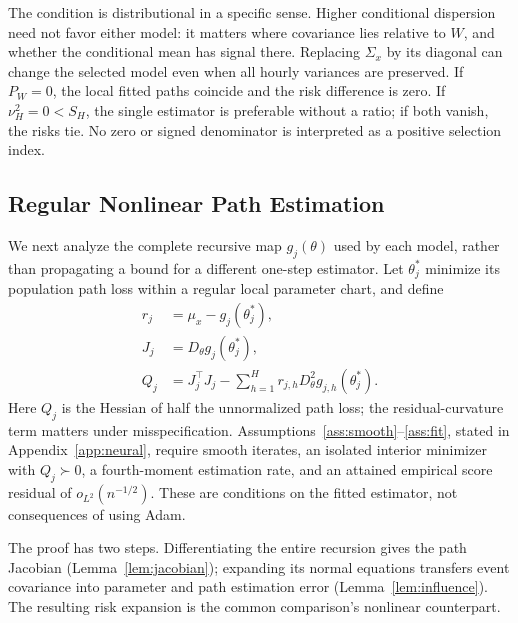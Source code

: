 The condition is distributional in a specific sense. Higher conditional dispersion need not favor either model: it matters where covariance lies relative to $W$, and whether the conditional mean has signal there. Replacing $\Sigma_x$ by its diagonal can change the selected model even when all hourly variances are preserved. If $P_W=0$, the local fitted paths coincide and the risk difference is zero. If $\nu_H^2=0<S_H$, the single estimator is preferable without a ratio; if both vanish, the risks tie. No zero or signed denominator is interpreted as a positive selection index.


\subsection{Regular Nonlinear Path Estimation}
We next analyze the complete recursive map $g_j(\theta)$ used by each model, rather than propagating a bound for a different one-step estimator. Let $\theta_j^*$ minimize its population path loss within a regular local parameter chart, and define
\begin{equation}
 \begin{aligned}
 r_j&=\mu_x-g_j(\theta_j^*),\\
 J_j&=D_\theta g_j(\theta_j^*),\\
 Q_j&=J_j^\top J_j-\sum_{h=1}^H r_{j,h}D_\theta^2g_{j,h}(\theta_j^*).
 \end{aligned}
 \label{eq:neural_curvature}
\end{equation}
Here $Q_j$ is the Hessian of half the unnormalized path loss; the residual-curvature term matters under misspecification. Assumptions~\ref{ass:smooth}--\ref{ass:fit}, stated in Appendix~\ref{app:neural}, require smooth iterates, an isolated interior minimizer with $Q_j\succ0$, a fourth-moment estimation rate, and an attained empirical score residual of $o_{L^2}(n^{-1/2})$. These are conditions on the fitted estimator, not consequences of using Adam.

The proof has two steps. Differentiating the entire recursion gives the path Jacobian (Lemma~\ref{lem:jacobian}); expanding its normal equations transfers event covariance into parameter and path estimation error (Lemma~\ref{lem:influence}). The resulting risk expansion is the common comparison's nonlinear counterpart.

